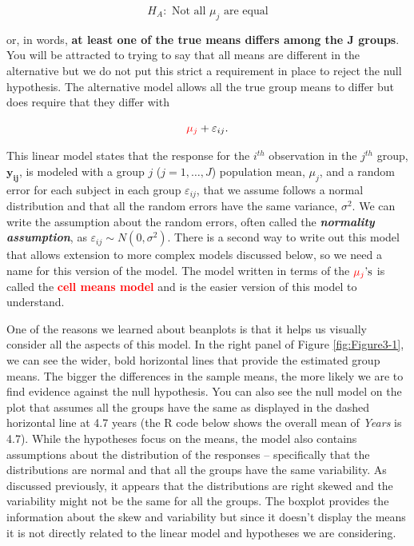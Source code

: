\documentclass[]{book}
\theoremstyle{definition}
\theoremstyle{definition}
\theoremstyle{remark}
\begin{document}
\[H_A: \text{ Not all } \mu_j \text{ are equal}\]

or, in words, \textbf{at least one of the true means differs among the J
groups}. You will be attracted to trying to say that all means are
different in the alternative but we do not put this strict a requirement
in place to reject the null hypothesis. The alternative model allows all
the true group means to differ but does require that they differ with

\[{\color{red}{\mu_j}}+\varepsilon_{ij}.\]

This linear model states that the response for the \(i^{th}\)
observation in the \(j^{th}\) group, \(\mathbf{y_{ij}}\), is modeled
with a group \(j\) (\(j=1, \ldots, J\)) population mean, \(\mu_j\), and
a random error for each subject in each group \(\varepsilon_{ij}\), that
we assume follows a normal distribution and that all the random errors
have the same variance, \(\sigma^2\). We can write the assumption about
the random errors, often called the \textbf{\emph{normality
assumption}}, as \(\varepsilon_{ij} \sim N(0,\sigma^2)\). There is a
second way to write out this model that allows extension to more complex
models discussed below, so we need a name for this version of the model.
The model written in terms of the \({\color{red}{\mu_j}}\text{'s}\) is
called the \textcolor{red}{\textbf{cell means model}} and is the easier
version of this model to understand.

One of the reasons we learned about beanplots is that it helps us
visually consider all the aspects of this model. In the right panel of
Figure \ref{fig:Figure3-1}, we can see the wider, bold horizontal lines
that provide the estimated group means. The bigger the differences in
the sample means, the more likely we are to find evidence against the
null hypothesis. You can also see the null model on the plot that
assumes all the groups have the same as displayed in the dashed
horizontal line at 4.7 years (the R code below shows the overall mean of
\emph{Years} is 4.7). While the hypotheses focus on the means, the model
also contains assumptions about the distribution of the responses --
specifically that the distributions are normal and that all the groups
have the same variability. As discussed previously, it appears that the
distributions are right skewed and the variability might not be the same
for all the groups. The boxplot provides the information about the skew
and variability but since it doesn't display the means it is not
directly related to the linear model and hypotheses we are considering.
\end{document}
